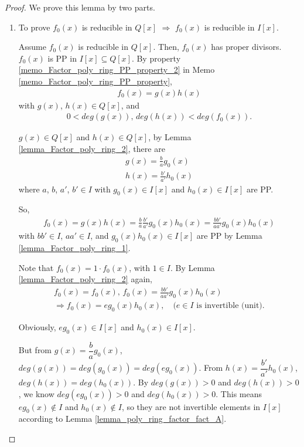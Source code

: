 \documentclass[utf8]{ctexbook}
\theoremstyle{definition}
\begin{document}
\begin{proof}
We prove this lemma by two parts.
\begin{enumerate}
\item{To prove $f_0 (x)$ is reducible in $Q[x]$ $\Longrightarrow$ $f_0 (x)$ is reducible in $I[x]$.

Assume $f_0 (x)$ is reducible in $Q[x]$. Then, $f_0 (x)$ has proper divisors. $f_0 (x)$ is PP in $I[x] \subseteq Q[x]$. By property \ref{memo_Factor_poly_ring_PP_property_2} in Memo \ref{memo_Factor_poly_ring_PP_property}, 
\begin{align*}
f_0 (x) = g(x) h(x)
\end{align*} 
with $g(x)$, $h(x) \in Q[x]$, and
\begin{align*}
0 < deg(g(x)), \, deg(h(x)) < deg(f_0 (x)) .
\end{align*}

$g(x) \in Q[x]$ and $h(x) \in Q[x]$, by Lemma \ref{lemma_Factor_poly_ring_2}, there are 
\begin{align*}
g(x) = \frac{b}{a} g_0 (x) \\
h(x) = \frac{b'}{a'} h_0 (x) 
\end{align*}
where $a$, $b$, $a'$, $b' \in I$ with $g_0 (x) \in I[x]$ and $h_0 (x) \in I[x]$ are PP.

So,
\begin{align*}
f_0 (x) = g(x) h(x) = \frac{b}{a} \frac{b'}{a'} g_0 (x) h_0 (x) = \frac{b b'}{a a'} g_0 (x) h_0 (x)
\end{align*}
with $b b' \in I$, $a a' \in I$, and $g_0 (x) h_0 (x) \in I[x]$ are PP by Lemma \ref{lemma_Factor_poly_ring_1}.

Note that $f_0 (x) = 1 \cdot f_0 (x)$, with $1 \in I$. By Lemma \ref{lemma_Factor_poly_ring_2} again,
\begin{align*}
f_0 (x) = f_0 (x) , \, f_0 (x) = \frac{b b'}{a a'} g_0 (x) h_0 (x) \\
\Longrightarrow f_0 (x) = e g_0 (x) h_0 (x), \quad (e \in I \mbox{ is invertible (unit)} .
\end{align*}

Obviously, $e g_0 (x) \in I[x]$ and $h_0 (x) \in I[x]$.

But from $g(x) = \dfrac{b}{a} g_0 (x)$, $deg(g(x)) = deg(g_0 (x)) = deg(e g_0 (x))$. From $h(x) = \dfrac{b'}{a'} h_0 (x) $, $deg(h(x)) = deg(h_0 (x))$. By $deg(g(x))> 0$ and $deg(h(x)) > 0$, we know $deg(e g_0 (x)) > 0$ and $deg(h_0 (x)) > 0$. This means $e g_0 (x) \not \in I$ and $h_0 (x) \not \in I$, so they are not invertible elements in $I[x]$ according to Lemma \ref{lemma_poly_ring_factor_fact_A}.

}
\end{enumerate}
\end{proof}
\end{document}
